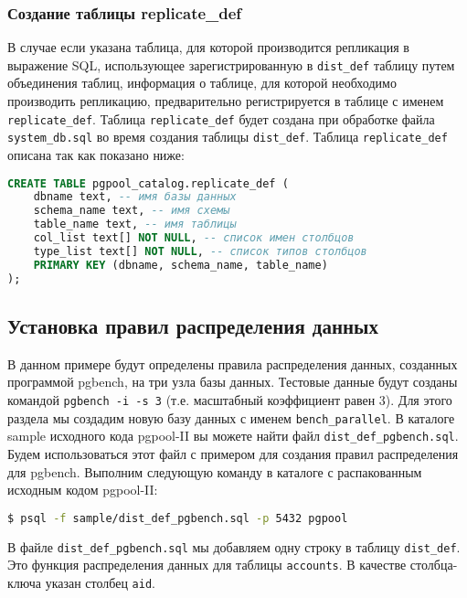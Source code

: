 \subsubsection{Создание таблицы replicate\_def}

В случае если указана таблица, для которой производится репликация в выражение SQL, использующее зарегистрированную в \lstinline!dist_def! таблицу путем объединения таблиц, информация о таблице, для которой необходимо производить репликацию, предварительно регистрируется в таблице с именем \lstinline!replicate_def!. Таблица \lstinline!replicate_def! будет создана при обработке файла \lstinline!system_db.sql! во время создания таблицы \lstinline!dist_def!. Таблица \lstinline!replicate_def! описана так как показано ниже:

\begin{lstlisting}[language=SQL,label=lst:pgpool31:1,caption=Создание таблицы replicate\_def]
CREATE TABLE pgpool_catalog.replicate_def (
    dbname text, -- имя базы данных
    schema_name text, -- имя схемы
    table_name text, -- имя таблицы
    col_list text[] NOT NULL, -- список имен столбцов
    type_list text[] NOT NULL, -- список типов столбцов
    PRIMARY KEY (dbname, schema_name, table_name)
);
\end{lstlisting}


\subsection{Установка правил распределения данных}
\label{sec:pgpool-II-raspr-data}

В данном примере будут определены правила распределения данных, созданных программой pgbench, на три узла базы данных. Тестовые данные будут созданы командой \lstinline!pgbench -i -s 3! (т.е. масштабный коэффициент равен 3). Для этого раздела мы создадим новую базу данных с именем \lstinline!bench_parallel!. В каталоге sample исходного кода pgpool-II вы можете найти файл \lstinline!dist_def_pgbench.sql!. Будем использоваться этот файл с примером для создания правил распределения для pgbench. Выполним следующую команду в каталоге с распакованным исходным кодом pgpool-II:

\begin{lstlisting}[language=Bash,label=lst:pgpool32,caption=Установка правил распределения данных]
$ psql -f sample/dist_def_pgbench.sql -p 5432 pgpool
\end{lstlisting}

В файле \lstinline!dist_def_pgbench.sql! мы добавляем одну строку в таблицу \lstinline!dist_def!. Это функция распределения данных для таблицы \lstinline!accounts!. В качестве столбца-ключа указан столбец \lstinline!aid!.

